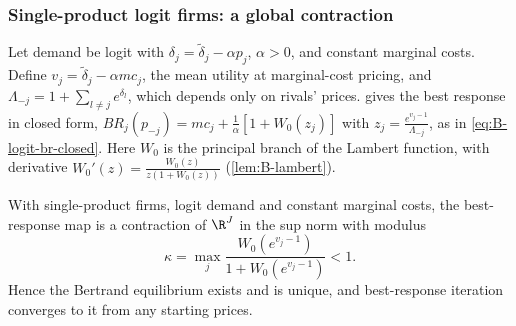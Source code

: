 \subsubsection{Single-product logit firms: a global contraction}

Let demand be logit with $\delta_j = \tilde\delta_j - \alpha p_j$, $\alpha > 0$, and constant marginal costs.
Define $v_j = \tilde\delta_j - \alpha mc_j$, the mean utility at marginal-cost pricing, and $\Lambda_{-j} = 1 +
\sum_{l \neq j}e^{\delta_l}$, which depends only on rivals' prices.  gives the best
response in closed form, $BR_j(p_{-j}) = mc_j + \frac{1}{\alpha}[1 + W_0(z_j)]$ with $z_j = \frac{e^{v_j - 1}}{\Lambda_{-j}}$,
as in \eqref{eq:B-logit-br-closed}. Here $W_0$ is the principal branch of the Lambert function, with derivative
$W_0'(z) = \frac{W_0(z)}{z(1 + W_0(z))}$ (\cref{lem:B-lambert}).

\begin{proposition}\label{prop:B-logit-br-contraction}
With single-product firms, logit demand and constant marginal costs, the best-response map is a contraction
of $\R^J$ in the sup norm with modulus
\begin{equation}\label{eq:B-logit-kappa}
  \kappa = \max_j\frac{W_0(e^{v_j - 1})}{1 + W_0(e^{v_j - 1})} < 1.
\end{equation}
Hence the Bertrand equilibrium exists and is unique, and best-response iteration converges to it from any
starting prices.
\end{proposition}

